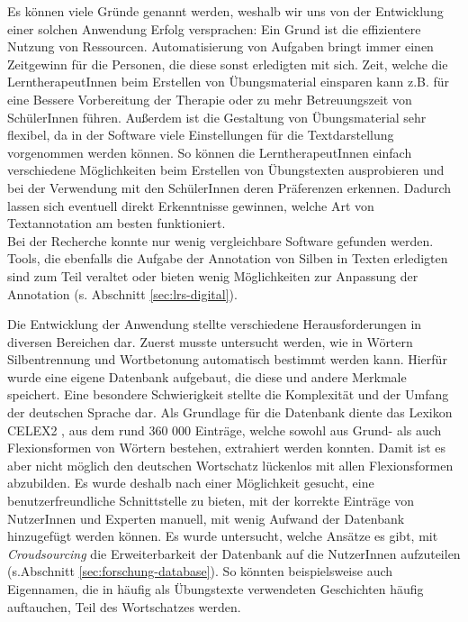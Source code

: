 Es können viele Gründe genannt werden, weshalb wir uns von der Entwicklung einer solchen Anwendung Erfolg versprachen: Ein Grund ist die effizientere Nutzung von Ressourcen. Automatisierung von Aufgaben bringt immer einen Zeitgewinn für die Personen, die diese sonst erledigten mit sich. Zeit, welche die LerntherapeutInnen beim Erstellen von Übungsmaterial einsparen kann z.B. für eine Bessere Vorbereitung der Therapie oder zu mehr Betreuungszeit von SchülerInnen führen. Außerdem ist die Gestaltung von Übungsmaterial sehr flexibel, da in der Software viele Einstellungen für die Textdarstellung vorgenommen werden können. So können die LerntherapeutInnen einfach verschiedene Möglichkeiten beim Erstellen von Übungstexten ausprobieren und bei der Verwendung mit den SchülerInnen deren Präferenzen erkennen. Dadurch lassen sich eventuell direkt Erkenntnisse gewinnen, welche Art von Textannotation am besten funktioniert.\\
Bei der Recherche konnte nur wenig vergleichbare Software gefunden werden. Tools, die ebenfalls die Aufgabe der Annotation von Silben in Texten erledigten sind zum Teil veraltet oder bieten wenig Möglichkeiten zur Anpassung der Annotation (s. Abschnitt \ref{sec:lrs-digital}).

Die Entwicklung der Anwendung stellte verschiedene Herausforderungen in diversen Bereichen dar. Zuerst musste untersucht werden, wie in Wörtern Silbentrennung und Wortbetonung automatisch bestimmt werden kann. Hierfür wurde eine eigene Datenbank aufgebaut, die diese und andere Merkmale speichert. Eine besondere Schwierigkeit stellte die Komplexität und der Umfang der deutschen Sprache dar. Als Grundlage für die Datenbank diente das Lexikon CELEX2 , aus dem rund 360 000 Einträge, welche sowohl aus Grund- als auch Flexionsformen von Wörtern bestehen, extrahiert werden konnten. Damit ist es aber nicht möglich den deutschen Wortschatz lückenlos mit allen Flexionsformen abzubilden. Es wurde deshalb nach einer Möglichkeit gesucht, eine benutzerfreundliche Schnittstelle zu bieten, mit der korrekte Einträge von NutzerInnen und Experten manuell, mit wenig Aufwand der Datenbank hinzugefügt werden können. Es wurde untersucht, welche Ansätze es gibt, mit \textit{Croudsourcing} die Erweiterbarkeit der Datenbank auf die NutzerInnen aufzuteilen (s.Abschnitt \ref{sec:forschung-database}). So könnten beispielsweise auch Eigennamen, die in häufig als Übungstexte verwendeten Geschichten häufig auftauchen, Teil des Wortschatzes werden.\\


